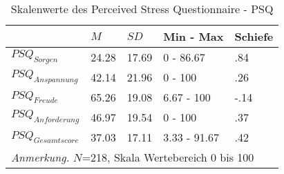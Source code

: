 \begin{table}[ht]
\centering
\captionsetup{margin=80pt,skip=5pt}
\caption{Skalenwerte des Perceived Stress Questionnaire - PSQ}
\label{table:AppPSQDeskriptiv}
\begin{tabular}{m{6em} m{3em}  m{3em}  m{5em} m{3em}} 
  \hline
  & $M$ & $SD$ & Min - Max & Schiefe\\
  \hline
  $PSQ_{Sorgen}$ & 24.28 & 17.69 & 0 - 86.67 & .84 \\
  $PSQ_{Anspannung}$ & 42.14 & 21.96 & 0 - 100 & .26\\
  $PSQ_{Freude}$ & 65.26 & 19.08 & 6.67 - 100 & -.14\\
  $PSQ_{Anforderung}$ & 46.97 & 19.54 & 0 - 100 & .37 \\
  $PSQ_{Gesamtscore}$ & 37.03 & 17.11 & 3.33 - 91.67 & .42\\
  \hline
  \multicolumn{5}{l}{\textit{Anmerkung.} $N$=218, Skala Wertebereich 0 bis 100}\\
\end{tabular}
\end{table}